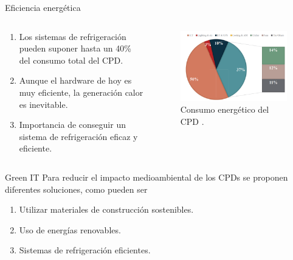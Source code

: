 \documentclass[aspectratio=169, compress]{beamer}
\begin{document}
\begin{frame}{Eficiencia energética}
    \begin{columns}
        \begin{column}{0.5\textwidth}
            \begin{enumerate}
                \item Los sistemas de refrigeración pueden suponer hasta un 40\% del consumo total del CPD. 
                \item Aunque el hardware de hoy es muy eficiente, la generación calor es inevitable. 
                \item Importancia de conseguir un sistema de refrigeración eficaz y eficiente. 
            \end{enumerate}        
        \end{column}
        
        \begin{column}{0.5\textwidth}  
            \begin{figure}
                \begin{center}
                    \includegraphics[scale=0.5]{../figures/consumo}
                    \caption{Consumo energético del CPD \cite{ZHANG2021102253}.}
                    \label{consumo_energetico}
                \end{center}
            \end{figure}        
        \end{column}
    \end{columns}    
\end{frame}

\begin{frame}{Green IT}
    Para reducir el impacto medioambiental de los CPDs se proponen diferentes soluciones, como pueden ser

    \begin{enumerate}
        \item Utilizar materiales de construcción sostenibles.
        \item Uso de energías renovables.
        \item Sistemas de refrigeración eficientes.
    \end{enumerate}
\end{frame}
\end{document}
